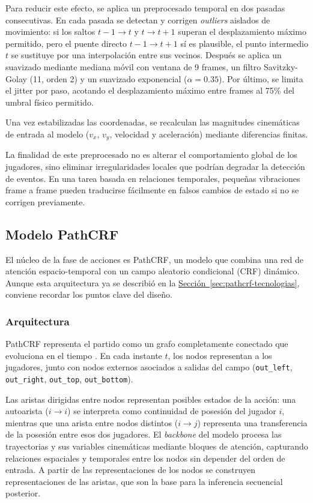 Para reducir este efecto, se aplica un preprocesado temporal en dos pasadas consecutivas. En cada pasada se detectan y corrigen \textit{outliers} aislados de movimiento: si los saltos \(t-1 \rightarrow t\) y \(t \rightarrow t+1\) superan el desplazamiento máximo permitido, pero el puente directo \(t-1 \rightarrow t+1\) sí es plausible, el punto intermedio \(t\) se sustituye por una interpolación entre sus vecinos. Después se aplica un suavizado mediante mediana móvil con ventana de 9 frames, un filtro Savitzky-Golay (11, orden 2) y un suavizado exponencial (\(\alpha = 0.35\)). Por último, se limita el jitter por paso, acotando el desplazamiento máximo entre frames al 75\% del umbral físico permitido.

Una vez estabilizadas las coordenadas, se recalculan las magnitudes cinemáticas de entrada al modelo (\(v_x\), \(v_y\), velocidad y aceleración) mediante diferencias finitas.

La finalidad de este preprocesado no es alterar el comportamiento global de los jugadores, sino eliminar irregularidades locales que podrían degradar la detección de eventos. En una tarea basada en relaciones temporales, pequeñas vibraciones frame a frame pueden traducirse fácilmente en falsos cambios de estado si no se corrigen previamente.

\subsection{Modelo PathCRF}
El núcleo de la fase de acciones es PathCRF, un modelo que combina una red de atención espacio-temporal con un campo aleatorio condicional (CRF) dinámico. Aunque esta arquitectura ya se describió en la \hyperref[sec:pathcrf-tecnologias]{Sección~\ref*{sec:pathcrf-tecnologias}}, conviene recordar los puntos clave del diseño.

\subsubsection{Arquitectura}
PathCRF representa el partido como un grafo completamente conectado que evoluciona en el tiempo . En cada instante \(t\), los nodos representan a los jugadores, junto con nodos externos asociados a salidas del campo (\texttt{out\_left}, \texttt{out\_right}, \texttt{out\_top}, \texttt{out\_bottom}). 

Las aristas dirigidas entre nodos representan posibles estados de la acción: una autoarista (\(i \rightarrow i\)) se interpreta como continuidad de posesión del jugador $i$, mientras que una arista entre nodos distintos (\(i \rightarrow j\)) representa una transferencia de la posesión entre esos dos jugadores. El \textit{backbone} del modelo procesa las trayectorias y sus variables cinemáticas mediante bloques de atención, capturando relaciones espaciales y temporales entre los nodos sin depender del orden de entrada. A partir de las representaciones de los nodos se construyen representaciones de las aristas, que son la base para la inferencia secuencial posterior.


